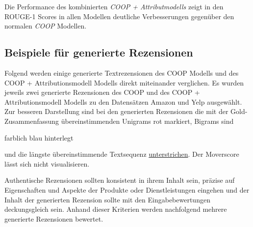 Die Performance des kombinierten \textit{COOP + Attributmodells} zeigt in den ROUGE-1 Scores in allen Modellen deutliche Verbesserungen gegenüber den normalen \textit{COOP} Modellen.


\subsection{Beispiele für generierte Rezensionen}


\small
\newlength{\DepthReference}
\setlength{\DepthReference}{1pt}%

\newlength{\HeightReference}
\setlength{\HeightReference}{7pt}


\newlength{\Width}%

\newcommand{\ccolorbox}[2][red]%
{%
    \settowidth{\Width}{#2}%
    \setlength{\fboxsep}{1pt}%
    \colorbox{#1}%
    {%
        \raisebox{-\DepthReference}%
        {%
                \parbox[b][\HeightReference+\DepthReference][c]{\Width}{\centering#2}%
        }%
    }%
}



\normalsize


Folgend werden einige generierte Textrezensionen des COOP Modells und des COOP + Attributionsmodell Modells direkt miteinander verglichen.
Es wurden jeweils zwei generierte Rezensionen des COOP und des COOP + Attributionsmodell Modells zu den Datensätzen Amazon und Yelp ausgewählt. 
Zur besseren Darstellung sind bei den generierten Rezensionen die mit der Gold-Zusammenfassung übereinstimmenden Unigrams \textcolor{HighlightColor}{rot} markiert, Bigrams sind \ccolorbox[BackgroundColor]{farblich blau hinterlegt} und die längste übereinstimmende Textsequenz \underline{unterstrichen}.
Der Moverscore lässt sich nicht visualisieren.

Authentische Rezensionen sollten konsistent in ihrem Inhalt sein, präzise auf Eigenschaften und Aspekte der Produkte oder Dienstleistungen eingehen und der Inhalt der generierten Rezension sollte mit den Eingabebewertungen deckungsgleich sein.
Anhand dieser Kriterien werden nachfolgend mehrere generierte Rezensionen bewertet.

